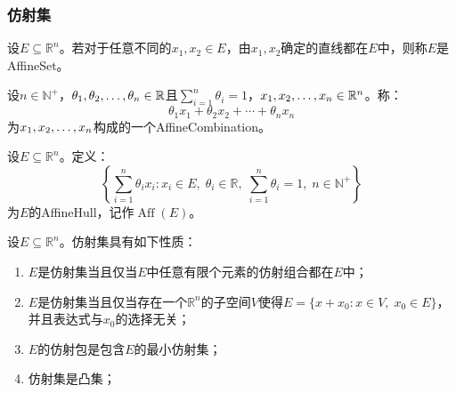 \subsubsection{仿射集}
\begin{definition}
	设$E\subseteq\mathbb{R}^{n}$。若对于任意不同的$x_1,x_2\in E$，由$x_1,x_2$确定的直线都在$E$中，则称$E$是\gls{AffineSet}。
\end{definition}
\begin{definition}
	设$n\in\mathbb{N}^+$，$\theta_1, \theta_2, \dots, \theta_{n}\in\mathbb{R}$且$\sum\limits_{i=1}^{n}\theta_i=1$，$x_1, x_2, \dots, x_{n}\in\mathbb{R}^{n}$。称：
	\begin{equation*}
		\theta_1x_1+\theta_2x_2+\cdots+\theta_nx_n
	\end{equation*}
	为$x_1, x_2, \dots, x_{n}$构成的一个\gls{AffineCombination}。
\end{definition}
\begin{definition}
	设$E\subseteq\mathbb{R}^{n}$。定义：
	\begin{equation*}
		\left\{\sum_{i=1}^{n}\theta_ix_i:x_i\in E,\;\theta_i\in\mathbb{R},\;\sum_{i=1}^{n}\theta_i=1,\;n\in\mathbb{N}^+\right\}
	\end{equation*}
	为$E$的\gls{AffineHull}，记作$\operatorname{Aff}(E)$。
\end{definition}
\begin{property}\label{prop:AffineSet}
	设$E\subseteq\mathbb{R}^{n}$。仿射集具有如下性质：
	\begin{enumerate}
		\item $E$是仿射集当且仅当$E$中任意有限个元素的仿射组合都在$E$中；
		\item $E$是仿射集当且仅当存在一个$\mathbb{R}^{n}$的子空间$V$使得$E=\{x+x_0:x\in V,\;x_0\in E\}$，并且表达式与$x_0$的选择无关；
		\item $E$的仿射包是包含$E$的最小仿射集；
		\item 仿射集是凸集；
	\end{enumerate}
\end{property}
